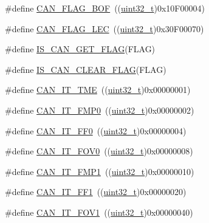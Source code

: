 \begin{DoxyCompactItemize}
\#define \hyperlink{group___c_a_n__flags_ga65f20612d0bf1692003882c0cdbadb1c}{C\+A\+N\+\_\+\+F\+L\+A\+G\+\_\+\+B\+OF}~((\hyperlink{_p_e___types_8h_a33594304e786b158f3fb30289278f5af}{uint32\+\_\+t})0x10\+F00004)
\item 
\#define \hyperlink{group___c_a_n__flags_ga73a774fa4d391aec0ea6552bf9372917}{C\+A\+N\+\_\+\+F\+L\+A\+G\+\_\+\+L\+EC}~((\hyperlink{_p_e___types_8h_a33594304e786b158f3fb30289278f5af}{uint32\+\_\+t})0x30\+F00070)
\item 
\#define \hyperlink{group___c_a_n__flags_ga38d33d1762ed3a331d214cdb3249866e}{I\+S\+\_\+\+C\+A\+N\+\_\+\+G\+E\+T\+\_\+\+F\+L\+AG}(F\+L\+AG)
\item 
\#define \hyperlink{group___c_a_n__flags_gac46f5fb953efb6163cf3b2e33a514d0c}{I\+S\+\_\+\+C\+A\+N\+\_\+\+C\+L\+E\+A\+R\+\_\+\+F\+L\+AG}(F\+L\+AG)
\item 
\#define \hyperlink{group___c_a_n__interrupts_ga619e36230fa2eb089a7c1936b5004eb9}{C\+A\+N\+\_\+\+I\+T\+\_\+\+T\+ME}~((\hyperlink{_p_e___types_8h_a33594304e786b158f3fb30289278f5af}{uint32\+\_\+t})0x00000001)
\item 
\#define \hyperlink{group___c_a_n__interrupts_ga3fe6fbf53e9d692957e87ad329bcd362}{C\+A\+N\+\_\+\+I\+T\+\_\+\+F\+M\+P0}~((\hyperlink{_p_e___types_8h_a33594304e786b158f3fb30289278f5af}{uint32\+\_\+t})0x00000002)
\item 
\#define \hyperlink{group___c_a_n__interrupts_gabf63043d9216de80ddc7ffe57b23ef67}{C\+A\+N\+\_\+\+I\+T\+\_\+\+F\+F0}~((\hyperlink{_p_e___types_8h_a33594304e786b158f3fb30289278f5af}{uint32\+\_\+t})0x00000004)
\item 
\#define \hyperlink{group___c_a_n__interrupts_ga066a4317f95669e5b5931c9a759cf248}{C\+A\+N\+\_\+\+I\+T\+\_\+\+F\+O\+V0}~((\hyperlink{_p_e___types_8h_a33594304e786b158f3fb30289278f5af}{uint32\+\_\+t})0x00000008)
\item 
\#define \hyperlink{group___c_a_n__interrupts_gaa0e101053fb203629e0e9a954213e71e}{C\+A\+N\+\_\+\+I\+T\+\_\+\+F\+M\+P1}~((\hyperlink{_p_e___types_8h_a33594304e786b158f3fb30289278f5af}{uint32\+\_\+t})0x00000010)
\item 
\#define \hyperlink{group___c_a_n__interrupts_ga93b86d884ce0624b4b36c991fd75fc1c}{C\+A\+N\+\_\+\+I\+T\+\_\+\+F\+F1}~((\hyperlink{_p_e___types_8h_a33594304e786b158f3fb30289278f5af}{uint32\+\_\+t})0x00000020)
\item 
\#define \hyperlink{group___c_a_n__interrupts_ga963301fdbede5f9a9665dc5b6210eaec}{C\+A\+N\+\_\+\+I\+T\+\_\+\+F\+O\+V1}~((\hyperlink{_p_e___types_8h_a33594304e786b158f3fb30289278f5af}{uint32\+\_\+t})0x00000040)

\end{DoxyCompactItemize}
